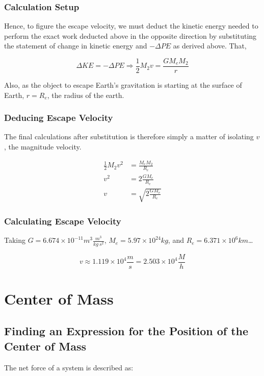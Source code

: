 \documentclass[letterpaper]{article}
\begin{document}
\subsubsection{Calculation Setup}
\label{sec:org8be9c2b}
Hence, to figure the escape velocity, we must deduct the kinetic energy needed to perform the exact work deducted above in the opposite direction by substituting the statement of change in kinetic energy and \(-\Delta PE\) as derived above. That,

\begin{equation}
\Delta KE = -\Delta PE \Rightarrow \frac{1}{2}M_2 v = \frac{GM_eM_2}{r}
\end{equation}

Also, as the object to escape Earth's gravitation is starting at the surface of Earth, \(r = R_e\), the radius of the earth.

\subsubsection{Deducing Escape Velocity}
\label{sec:orgee12f0f}
The final calculations after substitution is therefore simply a matter of isolating \(v\), the magnitude velocity.

\begin{align}
\frac{1}{2}M_2 v^2 &= \frac{M_eM_2}{R_e} \\
v^2 &= 2\frac{GM_e}{R_e} \\
v &= \sqrt{2\frac{GM_e}{R_e}} 
\end{align}

\subsubsection{Calculating Escape Velocity}
\label{sec:org73d6e5a}
Taking \(G = 6.674 \times 10^{-11} m^3 \frac{m^3}{kg\ s^2}\), \(M_e = 5.97 \times 10^{24} kg\), and \(R_e = 6.371 \times 10^6 km\)\ldots{}

\begin{equation}
v \approx 1.119 \times 10^4 \frac{m}{s} = 2.503 \times 10^4 \frac{M}{h}
\end{equation}

\section{Center of Mass}
\label{sec:org3c1ef7a}

\subsection{Finding an Expression for the Position of the Center of Mass}
\label{sec:org86d6aec}
The net force of a system is described as:
\end{document}
